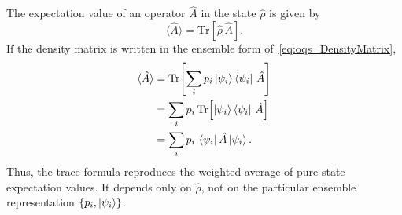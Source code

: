 The expectation value of an operator \(\hat{A}\) in the state \(\hat{\rho}\) is given by
\begin{equation*}
	\langle \hat{A} \rangle = \mathrm{Tr}[\hat{\rho}\,\hat{A}].
\end{equation*}
If the density matrix is written in the ensemble form of~\autoref{eq:oqs_DensityMatrix},
\begin{align*}
	\langle \hat{A} \rangle
	&= \mathrm{Tr}\!\left[\sum_i p_i \ket{\psi_i}\bra{\psi_i}\,\hat{A}\right] \notag\\
	&= \sum_i p_i\,\mathrm{Tr}\!\left[\ket{\psi_i}\bra{\psi_i}\,\hat{A}\right] \notag\\
	&= \sum_i p_i\,\bra{\psi_i}\hat{A}\ket{\psi_i}. \notag
\end{align*}
Thus, the trace formula reproduces the weighted average of pure-state expectation values. It depends only on \(\hat{\rho}\), not on the particular ensemble representation \(\{p_i,\ket{\psi_i}\}\).


